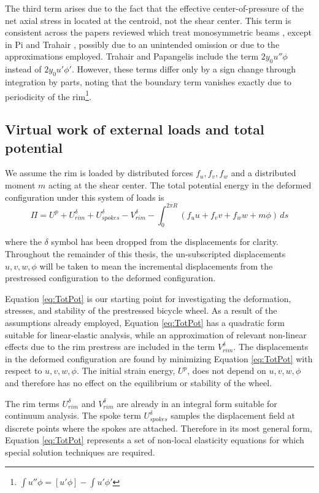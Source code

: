\documentclass[\rootdir/thesis.tex]{subfiles}
\begin{document}
The third term arises due to the fact that the effective center-of-pressure of the net axial stress in located at the centroid, not the shear center. This term is consistent across the papers reviewed which treat monosymmetric beams \cite{Pi1995,Pi1992,Ryu2012,Trahair1987}, except in Pi and Trahair \cite{Pi1992}, possibly due to an unintended omission or due to the approximations employed. Trahair and Papangelis include the term $2y_0u''\phi$ instead of $2y_0u'\phi'$. However, these terms differ only by a sign change through integration by parts, noting that the boundary term vanishes exactly due to periodicity of the rim\footnote{$\int u''\phi = [u'\phi] - \int u'\phi'$}.


\subsection{Virtual work of external loads and total potential}

We assume the rim is loaded by distributed forces $f_u,f_v,f_w$ and a distributed moment $m$ acting at the shear center. The total potential energy in the deformed configuration under this system of loads is
\begin{equation}
\label{eq:TotPot}
\Pi = U^p + U_{rim}^{\delta} + U_{spokes}^{\delta} - V_{rim}^{\delta} - \int_0^{2\pi R} (f_uu+f_vv+f_ww+m\phi)\, ds
\end{equation}

where the $\delta$ symbol has been dropped from the displacements for clarity. Throughout the remainder of this thesis, the un-subscripted displacements $u,v,w,\phi$ will be taken to mean the incremental displacements from the prestressed configuration to the deformed configuration.

Equation \eqref{eq:TotPot} is our starting point for investigating the deformation, stresses, and stability of the prestressed bicycle wheel. As a result of the assumptions already employed, Equation \eqref{eq:TotPot} has a quadratic form suitable for linear-elastic analysis, while an approximation of relevant non-linear effects due to the rim prestress are included in the term $V_{rim}^{\delta}$. The displacements in the deformed configuration are found by minimizing Equation \eqref{eq:TotPot} with respect to $u,v,w,\phi$. The initial strain energy, $U^p$, does not depend on $u,v,w,\phi$ and therefore has no effect on the equilibrium or stability of the wheel.

The rim terms $U_{rim}^{\delta}$ and $V_{rim}^{\delta}$ are already in an integral form suitable for continuum analysis. The spoke term $U_{spokes}^{\delta}$ samples the displacement field at discrete points where the spokes are attached. Therefore in its most general form, Equation \eqref{eq:TotPot} represents a set of non-local elasticity equations for which special solution techniques are required.
\end{document}
